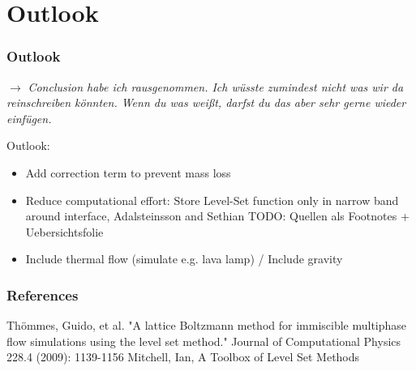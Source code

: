 \documentclass[ucs]{beamer}
\begin{document}
\section{Outlook}
\begin{frame}
\frametitle{Outlook}
$\rightarrow$ \textit{Conclusion habe ich rausgenommen. Ich wüsste zumindest nicht was wir da reinschreiben könnten. Wenn du was weißt, darfst du das aber sehr gerne wieder einfügen.}

\vspace{.8cm} 
Outlook:
\begin{itemize}
\item<1-> Add correction term to prevent mass loss
\item<2-> Reduce computational effort: Store Level-Set function only in narrow band around interface, Adalsteinsson and Sethian
TODO: Quellen als Footnotes + Uebersichtsfolie
\item<3-> Include thermal flow (simulate e.g. lava lamp) / Include gravity
\end{itemize}

\end{frame}

\begin{frame}
\frametitle{References}
\begin{thebibliography}{etw}
     Thömmes, Guido, et al. "A lattice Boltzmann method for immiscible multiphase flow simulations using the level set method." Journal of Computational Physics 228.4 (2009): 1139-1156
     Mitchell, Ian, A Toolbox of Level Set Methods
\end{thebibliography}
\end{frame}
\end{document}
